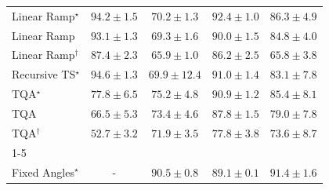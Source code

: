 \begin{tabular}{l|cccc|}
Linear Ramp$^\star$ & {\cellcolor[HTML]{702806}} \color[HTML]{F1F1F1} $94.2\pm 1.5$ & {\cellcolor[HTML]{FEB744}} \color[HTML]{000000} $70.2\pm 1.3$ & {\cellcolor[HTML]{812D05}} \color[HTML]{F1F1F1} $92.4\pm 1.0$ & {\cellcolor[HTML]{BC4503}} \color[HTML]{F1F1F1} $86.3\pm 4.9$ \\
Linear Ramp & {\cellcolor[HTML]{7B2B05}} \color[HTML]{F1F1F1} $93.1\pm 1.3$ & {\cellcolor[HTML]{FEBF4B}} \color[HTML]{000000} $69.3\pm 1.6$ & {\cellcolor[HTML]{983404}} \color[HTML]{F1F1F1} $90.0\pm 1.5$ & {\cellcolor[HTML]{CB4B02}} \color[HTML]{F1F1F1} $84.8\pm 4.0$ \\
Linear Ramp$^\dagger$ & {\cellcolor[HTML]{B13F03}} \color[HTML]{F1F1F1} $87.4\pm 2.3$ & {\cellcolor[HTML]{FED471}} \color[HTML]{000000} $65.9\pm 1.0$ & {\cellcolor[HTML]{BC4503}} \color[HTML]{F1F1F1} $86.2\pm 2.5$ & {\cellcolor[HTML]{FED573}} \color[HTML]{000000} $65.8\pm 3.8$ \\
Recursive TS$^\star$ & {\cellcolor[HTML]{6C2706}} \color[HTML]{F1F1F1} $94.6\pm 1.3$ & {\cellcolor[HTML]{FEBA46}} \color[HTML]{000000} $69.9\pm 12.4$ & {\cellcolor[HTML]{8E3104}} \color[HTML]{F1F1F1} $91.0\pm 1.4$ & {\cellcolor[HTML]{D55607}} \color[HTML]{F1F1F1} $83.1\pm 7.8$ \\
TQA$^\star$ & {\cellcolor[HTML]{F17C1A}} \color[HTML]{F1F1F1} $77.8\pm 6.5$ & {\cellcolor[HTML]{FA8F24}} \color[HTML]{F1F1F1} $75.2\pm 4.8$ & {\cellcolor[HTML]{903104}} \color[HTML]{F1F1F1} $90.9\pm 1.2$ & {\cellcolor[HTML]{C44802}} \color[HTML]{F1F1F1} $85.4\pm 8.1$ \\
TQA & {\cellcolor[HTML]{FED16B}} \color[HTML]{000000} $66.5\pm 5.3$ & {\cellcolor[HTML]{FE9E2D}} \color[HTML]{000000} $73.4\pm 4.6$ & {\cellcolor[HTML]{AE3E03}} \color[HTML]{F1F1F1} $87.8\pm 1.5$ & {\cellcolor[HTML]{ED7215}} \color[HTML]{F1F1F1} $79.0\pm 7.8$ \\
TQA$^\dagger$ & {\cellcolor[HTML]{FFFFE5}} \color[HTML]{000000} $52.7\pm 3.2$ & {\cellcolor[HTML]{FEAA38}} \color[HTML]{000000} $71.9\pm 3.5$ & {\cellcolor[HTML]{F17C1A}} \color[HTML]{F1F1F1} $77.8\pm 3.8$ & {\cellcolor[HTML]{FE9C2C}} \color[HTML]{000000} $73.6\pm 8.7$ \\
\cline{1-5}
\multicolumn{5}{c}{\rule{0pt}{8pt}PP} \\
\midrule
Fixed Angles$^\star$ & {\cellcolor[HTML]{000000}} \color[HTML]{F1F1F1} {\cellcolor{white}} \color{black} - & {\cellcolor[HTML]{006435}} \color[HTML]{F1F1F1} $90.5\pm 0.8$ & {\cellcolor[HTML]{066D39}} \color[HTML]{F1F1F1} $89.1\pm 0.1$ & {\cellcolor[HTML]{005E33}} \color[HTML]{F1F1F1} $91.4\pm 1.6$ \\

\end{tabular}
